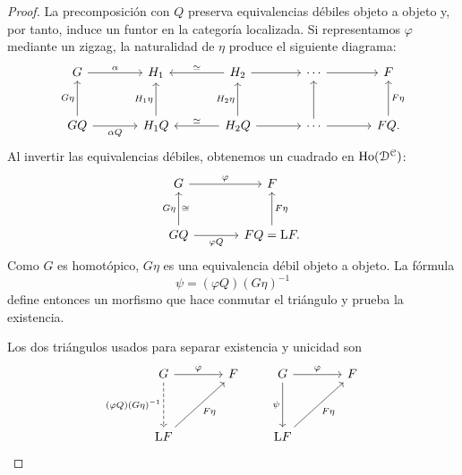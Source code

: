 \begin{proof}
La precomposición con $Q$ preserva equivalencias débiles objeto a objeto y, por tanto, induce un funtor en la categoría localizada. Si representamos $\varphi$ mediante un zigzag, la naturalidad de $\eta$ produce el siguiente diagrama:
\[
\begin{tikzcd}[column sep=large,row sep=large]
G\arrow[r,"\alpha"]&H_1&H_2\arrow[l,"\simeq"']\arrow[r]&\cdots\arrow[r]&F\\
GQ\arrow[u,"G\eta"]\arrow[r,"\alpha Q"']
&H_1Q\arrow[u,"H_1\eta"]
&H_2Q\arrow[u,"H_2\eta"]\arrow[l,"\simeq"']\arrow[r]
&\cdots\arrow[u]\arrow[r]&FQ\arrow[u,"F\eta"'].
\end{tikzcd}
\]
Al invertir las equivalencias débiles, obtenemos un cuadrado en $\operatorname{Ho}(\mathcal D^{\mathcal C})$:
\[
\begin{tikzcd}[column sep=large,row sep=large]
G\arrow[r,"\varphi"]&F\\
GQ\arrow[u,"G\eta","\cong"']\arrow[r,"\varphi Q"']
&FQ=\mathrm LF\arrow[u,"F\eta"'] .
\end{tikzcd}
\]
Como $G$ es homotópico, $G\eta$ es una equivalencia débil objeto a objeto. La fórmula
\[
\psi=(\varphi Q)(G\eta)^{-1}
\]
define entonces un morfismo que hace conmutar el triángulo y prueba la existencia.

Los dos triángulos usados para separar existencia y unicidad son
\[
\begin{tikzcd}[column sep=large,row sep=huge]
G\arrow[r,"\varphi"]\arrow[d,dashed,"{(\varphi Q)(G\eta)^{-1}}"']&F\\
\mathrm LF\arrow[ur,"F\eta"']&
\end{tikzcd}
\qquad
\begin{tikzcd}[column sep=large,row sep=huge]
G\arrow[r,"\varphi"]\arrow[d,"\psi"']&F\\
\mathrm LF\arrow[ur,"F\eta"']&
\end{tikzcd}
\]


\end{proof}
